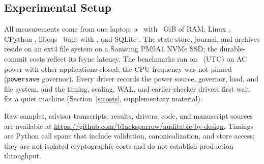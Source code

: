 \subsection{Experimental Setup}
All measurements come from one laptop: a \EnvCpu\ with \EnvMem~GiB of RAM, Linux \EnvKernel, CPython \EnvPython, liboqs \EnvLiboqs\ built with \EnvCompiler, and SQLite \EnvSqlite. The state store, journal, and archives reside on an ext4 file system on a Samsung PM9A1 NVMe SSD; the durable-commit costs reflect its fsync latency. The benchmarks ran on \EnvDate\ (UTC) on AC power with other applications closed; the CPU frequency was not pinned (\texttt{powersave} governor). Every driver records the power source, governor, load, and file system, and the timing, scaling, WAL, and earlier-checker drivers first wait for a quiet machine (Section~\ref{s:costs}, supplementary material).

Raw samples, advisor transcripts, results, drivers, code, and manuscript sources are available at \url{https://github.com/b1acksparrow/auditable-by-design}.
Timings are Python call spans that include validation, canonicalization, and store access; they are not isolated cryptographic costs and do not establish production throughput.

